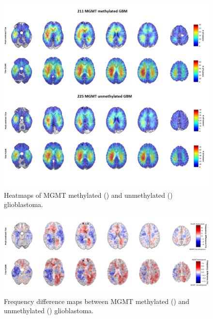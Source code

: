 \begin{figure}
    \centering
    \includegraphics[width=\textwidth]{Figures/Heatmap_MGMT_status.png}

    \caption{Heatmaps of \acrshort{MGMT} methylated () and unmethylated () glioblastoma.}\label{fig:HGG_location_heatmap_genetic}
\end{figure}

\begin{figure}
    \centering
    \includegraphics[width=\textwidth]{Figures/Frequency_map.png}

    \caption{Frequency difference maps between \acrshort{MGMT} methylated () and unmethylated () glioblastoma.}\label{fig:HGG_location_frequency_map}
\end{figure}

